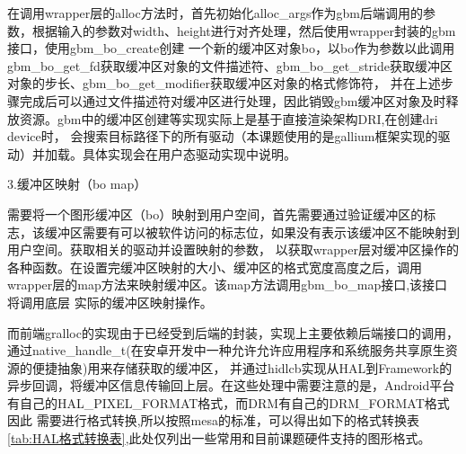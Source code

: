 在调用wrapper层的alloc方法时，首先初始化alloc\_args作为gbm后端调用的参数，根据输入的参数对width、height进行对齐处理，然后使用wrapper封装的gbm接口，使用gbm\_bo\_create创建
一个新的缓冲区对象bo，以bo作为参数以此调用gbm\_bo\_get\_fd获取缓冲区对象的文件描述符、gbm\_bo\_get\_stride获取缓冲区对象的步长、gbm\_bo\_get\_modifier获取缓冲区对象的格式修饰符，
并在上述步骤完成后可以通过文件描述符对缓冲区进行处理，因此销毁gbm缓冲区对象及时释放资源。gbm中的缓冲区创建等实现实际上是基于直接渲染架构DRI,在创建dri device时，
会搜索目标路径下的所有驱动（本课题使用的是gallium框架实现的驱动）并加载。具体实现会在用户态驱动实现中说明。



3.缓冲区映射（bo map）

需要将一个图形缓冲区（bo）映射到用户空间，首先需要通过验证缓冲区的标志，该缓冲区需要有可以被软件访问的标志位，如果没有表示该缓冲区不能映射到用户空间。获取相关的驱动并设置映射的参数，
以获取wrapper层对缓冲区操作的各种函数。在设置完缓冲区映射的大小、缓冲区的格式宽度高度之后，调用wrapper层的map方法来映射缓冲区。该map方法调用gbm\_bo\_map接口,该接口将调用底层
实际的缓冲区映射操作。

而前端gralloc的实现由于已经受到后端的封装，实现上主要依赖后端接口的调用，通过native\_handle\_t(在安卓开发中一种允许允许应用程序和系统服务共享原生资源的便捷抽象)用来存储获取的缓冲区，
并通过hidlcb实现从HAL到Framework的异步回调，将缓冲区信息传输回上层。在这些处理中需要注意的是，Android平台有自己的HAL\_PIXEL\_FORMAT格式，而DRM有自己的DRM\_FORMAT格式因此
需要进行格式转换,所以按照mesa的标准，可以得出如下的格式转换表\ref{tab:HAL格式转换表},此处仅列出一些常用和目前课题硬件支持的图形格式。

